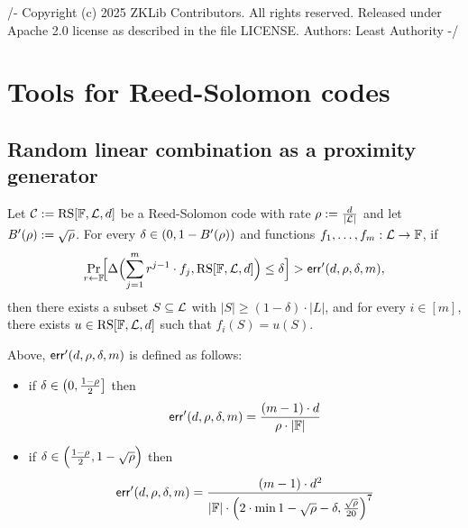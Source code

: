 /-
Copyright (c) 2025 ZKLib Contributors. All rights reserved.
Released under Apache 2.0 license as described in the file LICENSE.
Authors: Least Authority
-/
\chapter{Tools for Reed-Solomon codes}

\section{Random linear combination as a proximity generator}\label{sec:proximity_gap}


\begin{theorem}\label{thm:proximity_gap}
\leanok
{}
    Let $\mathcal{C} := \mathrm{RS}[\mathbb{F},\mathcal{L},d]$ be a Reed-Solomon code with rate $\rho:=\frac{d}{|\mathcal{L}|}$ and let $B'(\rho):=\sqrt{\rho}$. For every $\delta \in (0,1 - B'(\rho))$ and functions $f_1,\ldots,f_m : \mathcal{L} \to \mathbb{F}$, if
    \[
    \Pr_{r\leftarrow\mathbb{F}}\!\Bigl[
      \Delta\Bigl(\sum_{j=1}^m r^{j - 1}\cdot {f_j},\mathrm{RS}[\mathbb{F},\mathcal{L},d]\Bigr)
      \le \delta
    \Bigr]>\mathsf{err}'(d,\rho,\delta,m),
    \]
    then there exists a subset $S \subseteq \mathcal{L}$ with $|S| \ge (1 - \delta)\cdot|L|$,
    and for every $i \in [m]$, there exists $u \in \mathrm{RS}[\mathbb{F},\mathcal{L},d]$ such that $f_i(S) = u(S)$.
    
    \medskip
    
    \noindent
    Above, $\mathsf{err}'(d,\rho,\delta,m)$ is defined as follows:
    \begin{itemize}
        \item if $\delta \in \left(0,\frac{1-\rho}{2}\right]$ then
            \[
                \mathsf{err}'(d,\rho,\delta,m)=\frac{(m-1)\cdot d}{\rho\cdot|\mathbb{F}|}
            \]
        \item if $\delta \in \Bigl(\frac{1-\rho}{2}, 1-\sqrt{\rho}\Bigr)$ then
        \[
            \mathsf{err}'(d,\rho,\delta,m)=\frac{(m-1)\cdot {d}^2}{|\mathbb{F}|\cdot{\Bigl(2\cdot\min{1-\sqrt{\rho}-\delta,\frac{\sqrt{\rho}}{20}}\Bigr)}^7}
        \]
    \end{itemize}
    \end{theorem}
    